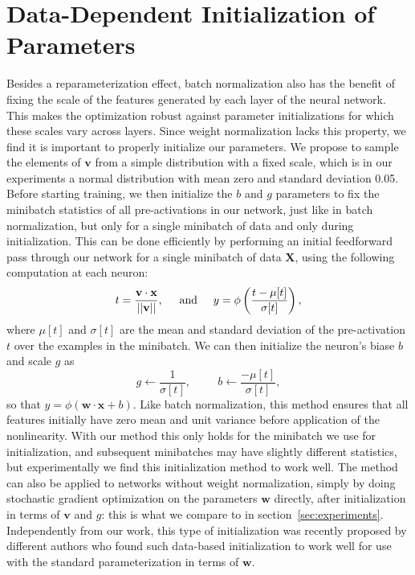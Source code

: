 \documentclass{article}
\newcommand{\bx}{\mathbf{x}}
\newcommand{\bv}{\mathbf{v}}
\newcommand{\bw}{\mathbf{w}}
\newcommand{\X}{\mathbf{X}}
\begin{document}
\section{Data-Dependent Initialization of Parameters}
\label{sec:init}
Besides a reparameterization effect, batch normalization also has the benefit of fixing the scale of the features generated by each layer of the neural network. This makes the optimization robust against parameter initializations for which these scales vary across layers. Since weight normalization lacks this property, we find it is important to properly initialize our parameters. We propose to sample the elements of $\bv$ from a simple distribution with a fixed scale, which is in our experiments a normal distribution with mean zero and standard deviation 0.05. Before starting training, we then initialize the $b$ and $g$ parameters to fix the minibatch statistics of all pre-activations in our network, just like in batch normalization, but only for a single minibatch of data and only during initialization. This can be done efficiently by performing an initial feedforward pass through our network for a single minibatch of data $\X$, using the following computation at each neuron:
\begin{equation}
t = \frac{\bv\cdot\bx}{||\bv||}, \hspace{0.5cm} \text{and} \hspace{0.5cm} y = \phi\left(\frac{t - \mu[t]}{\sigma[t]}\right),
\end{equation}
where $\mu[t]$ and $\sigma[t]$ are the mean and standard deviation of the pre-activation $t$ over the examples in the minibatch. We can then initialize the neuron's biase $b$ and scale $g$ as
\begin{equation}
g \leftarrow \frac{1}{\sigma[t]}, \hspace{1cm} b \leftarrow \frac{-\mu[t]}{\sigma[t]},
\end{equation}
so that $y = \phi(\bw\cdot\bx + b)$. Like batch normalization, this method ensures that all features initially have zero mean and unit variance before application of the nonlinearity. With our method this only holds for the minibatch we use for initialization, and subsequent minibatches may have slightly different statistics, but experimentally we find this initialization method to work well. The method can also be applied to networks without weight normalization, simply by doing stochastic gradient optimization on the parameters $\bw$ directly, after initialization in terms of $\bv$ and $g$: this is what we compare to in section~\ref{sec:experiments}. Independently from our work, this type of initialization was recently proposed by different authors \cite{mishkin2015all,krahenbuhl2015data} who found such data-based initialization to work well for use with the standard parameterization in terms of $\bw$.
\end{document}
